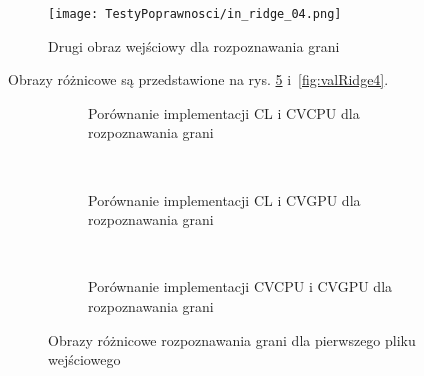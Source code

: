 \begin{figure}[h]
\begin{center}
\texttt{[image: TestyPoprawnosci/in\_ridge\_04.png]}
\end{center}
\caption{Drugi obraz wejściowy dla rozpoznawania grani}
\label{fig:valRidge04}
\end{figure}

Obrazy różnicowe są przedstawione na rys. \ref{fig:valRidge1} i~\ref{fig:valRidge4}. 

\begin{figure}[h]
\begin{subfigure}[t]{0.3\textwidth}
	\centering
	\setlength\fboxsep{0pt}
	\setlength\fboxrule{0.5pt}
	\caption{Porównanie implementacji CL i CVCPU dla rozpoznawania grani}
	\label{fig:valRidge1CLCVCPU}
\end{subfigure}
~
\begin{subfigure}[t]{0.3\textwidth}
	\centering
	\setlength\fboxsep{0pt}
	\setlength\fboxrule{0.5pt}
	\caption{Porównanie implementacji CL i CVGPU dla rozpoznawania grani}
	\label{fig:valRidge1CLCVGPU}
\end{subfigure}
~
\begin{subfigure}[t]{0.3\textwidth}
	\centering
	\setlength\fboxsep{0pt}
	\setlength\fboxrule{0.5pt}
	\caption{Porównanie implementacji CVCPU i CVGPU dla rozpoznawania grani}
	\label{fig:valRidge1CVCPUCVGPU}                 
\end{subfigure}
\caption{Obrazy różnicowe rozpoznawania grani dla pierwszego pliku wejściowego}

\label{fig:valRidge1}
\end{figure}

